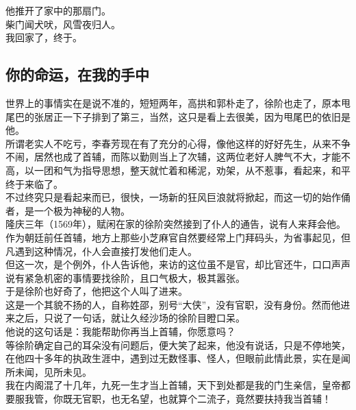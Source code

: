 \begin{multicols}{\theparacolNo}
他推开了家中的那扇门。\\

柴门闻犬吠，风雪夜归人。\\

我回家了，终于。\\

\subsection{你的命运，在我的手中}
世界上的事情实在是说不准的，短短两年，高拱和郭朴走了，徐阶也走了，原本甩尾巴的张居正一下子排到了第三，当然，这只是看上去很美，因为甩尾巴的依旧是他。\\

所谓老实人不吃亏，李春芳现在有了充分的心得，像他这样的好好先生，从来不争不闹，居然也成了首辅，而陈以勤则当上了次辅，这两位老好人脾气不大，才能不高，以一团和气为指导思想，整天就忙着和稀泥，劝架，从不惹事，看起来，和平终于来临了。\\

不过终究只是看起来而已，很快，一场新的狂风巨浪就将掀起，而这一切的始作俑者，是一个极为神秘的人物。\\

隆庆三年（1569年），赋闲在家的徐阶突然接到了仆人的通告，说有人来拜会他。作为朝廷前任首辅，地方上那些小芝麻官自然要经常上门拜码头，为省事起见，但凡遇到这种情况，仆人会直接打发他们走人。\\

但这一次，是个例外，仆人告诉他，来访的这位虽不是官，却比官还牛，口口声声说有紧急机密的事情要找徐阶，且口气极大，极其嚣张。\\

于是徐阶也好奇了，他把这个人叫了进来。\\

这是一个其貌不扬的人，自称姓邵，别号“大侠”，没有官职，没有身份。然而他进来之后，只说了一句话，就让久经沙场的徐阶目瞪口呆。\\

他说的这句话是：我能帮助你再当上首辅，你愿意吗？\\

等徐阶确定自己的耳朵没有问题后，便大笑了起来，他没有说话，只是不停地笑，在他四十多年的执政生涯中，遇到过无数怪事、怪人，但眼前此情此景，实在是闻所未闻，见所未见。\\

我在内阁混了十几年，九死一生才当上首辅，天下到处都是我的门生亲信，皇帝都要服我管，你既无官职，也无名望，也就算个二流子，竟然要扶持我当首辅！\\


\end{multicols}
